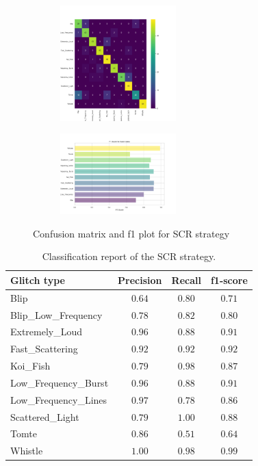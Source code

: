 \begin{figure}[H]
\centering
\begin{subfigure}
  \centering
  \includegraphics[width=0.49\textwidth]{Images/cm_SCR_MultiView_50epochs.png}  
  \label{fig:sub-first7}
\end{subfigure}
\begin{subfigure}
  \centering
  \includegraphics[width=0.49\textwidth]{Images/f1_SCR_MultiView_50epochs.png}  
  \label{fig:sub-second7}
\end{subfigure}
\caption{Confusion matrix and f1 plot for SCR strategy}
\label{fig:cm_f1_scr_baseline}
\end{figure}
\begin{table}[ht]
\centering
    \begin{tabular}{|l|c c c|}
    \hline
    \textbf{Glitch type} & \textbf{Precision} & \textbf{Recall} & \textbf{f1-score} \\ \hline
    Blip & $0.64$ & $0.80$ & $0.71$ \\
    Blip\_Low\_Frequency & $0.78$ & $0.82$ & $0.80$\\
    Extremely\_Loud & $0.96$ & $0.88$ &  $0.91$\\
    Fast\_Scattering & $0.92$ & $0.92$ &  $0.92$\\
    Koi\_Fish & $0.79$ & $0.98$ & $0.87$\\
    Low\_Frequency\_Burst & $0.96$ & $0.88$ & $0.91$\\
    Low\_Frequency\_Lines & $0.97$ & $0.78$ & $0.86$\\
    Scattered\_Light & $0.79$ & $1.00$ & $0.88$ \\
    Tomte & $0.86$ & $0.51$ & $0.64$ \\
    Whistle & $1.00$ & $0.98$ & $0.99$ \\
    \hline
    \end{tabular}
    \caption{Classification report of the SCR strategy.}
    \label{tbl:RQ1_class_report_scr}
\end{table}

